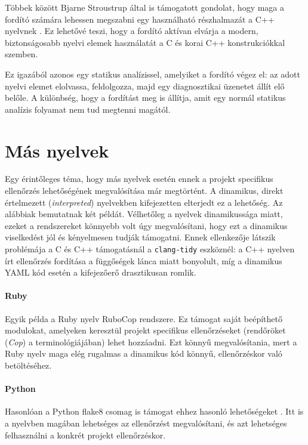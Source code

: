 Többek között Bjarne Stroustrup által is támogatott gondolat, hogy maga a fordító számára lehessen megszabni egy használható részhalmazát a C++ nyelvnek \cite{stroustrupDesignAlternativesTypeandResource2022}.
Ez lehetővé teszi, hogy a fordító aktívan elvárja a modern, biztonságosabb nyelvi elemek használatát a C és korai C++ konstrukciókkal szemben.

Ez igazából azonos egy statikus analízissel, amelyiket a fordító végez el: az adott nyelvi elemet elolvassa, feldolgozza, majd egy diagnosztikai üzenetet állít elő belőle.
A különbség, hogy a fordítást meg is állítja, amit egy normál statikus analízis folyamat nem tud megtenni magától.

\section*{Más nyelvek}

Egy érintőleges téma, hogy más nyelvek esetén ennek a projekt specifikus ellenőrzés lehetőségének megvalósítása már megtörtént.
A dinamikus, direkt értelmezett ({\it interpreted}) nyelvekben kifejezetten elterjedt ez a lehetőség.
Az alábbiak bemutatnak két példát.
Vélhetőleg a nyelvek dinamikussága miatt, ezeket a rendszereket könnyebb volt úgy megvalósítani, hogy ezt a dinamikus viselkedést jól és kényelmesen tudják támogatni.
Ennek ellenkezője látszik problémája a C és C++ támogatásnál a {\tt clang-tidy} eszköznél: a C++ nyelven írt ellenőrzés fordítása a függőségek lánca miatt bonyolult, míg a dinamikus YAML kód esetén a kifejezőerő drasztikusan romlik.

\paragraph{Ruby}
Egyik példa a Ruby nyelv RuboCop rendszere.
Ez támogat saját  beépíthető modulokat, amelyeken keresztül projekt specifikus ellenőrzéseket (rendőröket ({\it Cop}) a terminológiájában) lehet hozzáadni.
Ezt könnyű megvalósítania, mert a Ruby nyelv maga elég rugalmas a dinamikus kód könnyű, ellenőrzéskor való betöltéséhez.

\paragraph{Python}
Hasonlóan a Python flake8 csomag is támogat ehhez hasonló lehetőségeket .
Itt is a nyelvben magában lehetséges az ellenőrzést megvalósítani, és azt lehetséges felhasználni a konkrét projekt ellenőrzéskor.

